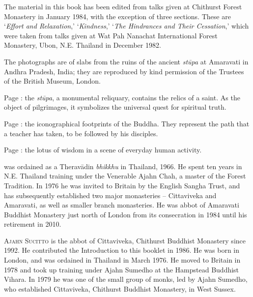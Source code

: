 
{\centering\par
\Large\scshape\chapTitleFont\thetitle
\par}
\vspace*{2\baselineskip}

{%
\setlength{\parskip}{1.5em}
\setlength{\parindent}{0pt}

The material in this book has been edited from talks given at Chithurst Forest Monastery in January 1984, with the exception of three sections. These are `\textit{Effort and Relaxation},' `\textit{Kindness},' `\textit{The Hindrances and Their Cessation},' which were taken from talks given at Wat Pah Nanachat International Forest Monastery, Ubon, N.E. Thailand in December 1982.

The photographs are of slabs from the ruins of the ancient \textit{st\=upa} at Amaravati in Andhra Pradesh, India; they are reproduced by kind permission of the Trustees of the British Museum, London.

Page \pageref{image-stupa}: the \textit{st\=upa}, a monumental reliquary, contains the relics of a saint. As the object of pilgrimages, it symbolizes the universal quest for spiritual truth.

Page \pageref{image-feet}: the iconographical footprints of the Buddha. They represent the path that a teacher has taken, to be followed by his disciples.

Page \pageref{image-lotus-scene}: the lotus of wisdom in a scene of everyday human activity.

\clearpage
\thispagestyle{empty}

{\scshape \theauthor} was ordained as a Therav\=adin \textit{bhikkhu} in Thailand, 1966. He spent ten years in N.E. Thailand training under the Venerable Ajahn Chah, a master of the Forest Tradition. In 1976 he was invited to Britain by the English Sangha Trust, and has subsequently established two major monasteries -- Cittaviveka and Amaravati, as well as smaller branch monasteries. He was abbot of Amaravati Buddhist Monastery just north of London from its consecration in 1984 until his retirement in 2010.

{\scshape Ajahn Sucitto} is the abbot of Cittaviveka, Chithurst Buddhist Monastery since 1992. He contributed the Introduction to this booklet in 1986. He was born in London, and was ordained in Thailand in March 1976. He moved to Britain in 1978 and took up training under Ajahn Sumedho at the Hampstead Buddhist Vihara. In 1979 he was one of the small group of monks, led by Ajahn Sumedho, who established Cittaviveka, Chithurst Buddhist Monastery, in West Sussex.


}

